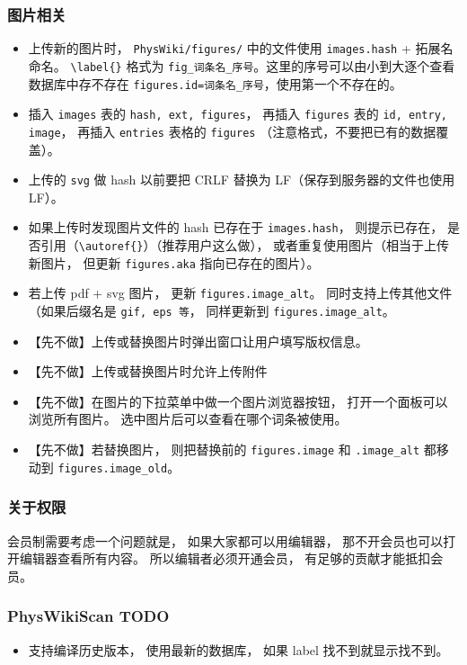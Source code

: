\subsubsection{图片相关}
\begin{itemize}
\item 上传新的图片时， \verb|PhysWiki/figures/| 中的文件使用 \verb|images.hash| + 拓展名命名。 \verb|\label{}| 格式为 \verb|fig_词条名_序号|。这里的序号可以由小到大逐个查看数据库中存不存在 \verb|figures.id=词条名_序号|，使用第一个不存在的。
\item 插入 \verb|images| 表的 \verb|hash, ext, figures|， 再插入 \verb|figures| 表的 \verb|id, entry, image|， 再插入 \verb|entries| 表格的 \verb|figures| （注意格式，不要把已有的数据覆盖）。 
\item 上传的 \verb|svg| 做 hash 以前要把 CRLF 替换为 LF（保存到服务器的文件也使用 LF）。
\item 如果上传时发现图片文件的 hash 已存在于 \verb|images.hash|， 则提示已存在， 是否引用（\verb|\autoref{}|）（推荐用户这么做）， 或者重复使用图片（相当于上传新图片， 但更新 \verb|figures.aka| 指向已存在的图片）。 
\item 若上传 pdf + svg 图片， 更新 \verb|figures.image_alt|。 同时支持上传其他文件（如果后缀名是 \verb|gif, eps 等|， 同样更新到 \verb|figures.image_alt|。
\item 【先不做】上传或替换图片时弹出窗口让用户填写版权信息。
\item 【先不做】上传或替换图片时允许上传附件
\item 【先不做】在图片的下拉菜单中做一个图片浏览器按钮， 打开一个面板可以浏览所有图片。 选中图片后可以查看在哪个词条被使用。
\item 【先不做】若替换图片， 则把替换前的 \verb|figures.image| 和 \verb|.image_alt| 都移动到 \verb|figures.image_old|。 
\end{itemize}

\subsubsection{关于权限}
会员制需要考虑一个问题就是， 如果大家都可以用编辑器， 那不开会员也可以打开编辑器查看所有内容。 所以编辑者必须开通会员， 有足够的贡献才能抵扣会员。

\subsubsection{PhysWikiScan TODO}
\begin{itemize}
\item 支持编译历史版本， 使用最新的数据库， 如果 label 找不到就显示找不到。
\end{itemize}

